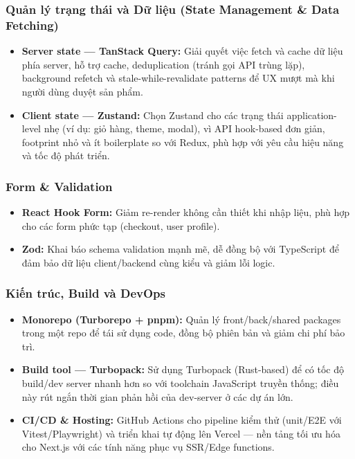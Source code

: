\subsubsection{Quản lý trạng thái và Dữ liệu (State Management \& Data Fetching)}
\begin{itemize}
  \item \textbf{Server state — TanStack Query:} Giải quyết việc fetch và cache dữ liệu phía server, hỗ trợ cache, deduplication (tránh gọi API trùng lặp), background refetch và stale-while-revalidate patterns để UX mượt mà khi người dùng duyệt sản phẩm.
  \item \textbf{Client state — Zustand:} Chọn Zustand cho các trạng thái application-level nhẹ (ví dụ: giỏ hàng, theme, modal), vì API hook-based đơn giản, footprint nhỏ và ít boilerplate so với Redux, phù hợp với yêu cầu hiệu năng và tốc độ phát triển.
\end{itemize}

\subsubsection{Form \& Validation}
\begin{itemize}
  \item \textbf{React Hook Form:} Giảm re-render không cần thiết khi nhập liệu, phù hợp cho các form phức tạp (checkout, user profile).
  \item \textbf{Zod:} Khai báo schema validation mạnh mẽ, dễ đồng bộ với TypeScript để đảm bảo dữ liệu client/backend cùng kiểu và giảm lỗi logic.
\end{itemize}

\subsubsection{Kiến trúc, Build và DevOps}
\begin{itemize}
  \item \textbf{Monorepo (Turborepo + pnpm):} Quản lý front/back/shared packages trong một repo để tái sử dụng code, đồng bộ phiên bản và giảm chi phí bảo trì.
  \item \textbf{Build tool — Turbopack:} Sử dụng Turbopack (Rust-based) để có tốc độ build/dev server nhanh hơn so với toolchain JavaScript truyền thống; điều này rút ngắn thời gian phản hồi của dev-server ở các dự án lớn.
  \item \textbf{CI/CD \& Hosting:} GitHub Actions cho pipeline kiểm thử (unit/E2E với Vitest/Playwright) và triển khai tự động lên Vercel — nền tảng tối ưu hóa cho Next.js với các tính năng phục vụ SSR/Edge functions.
\end{itemize}

